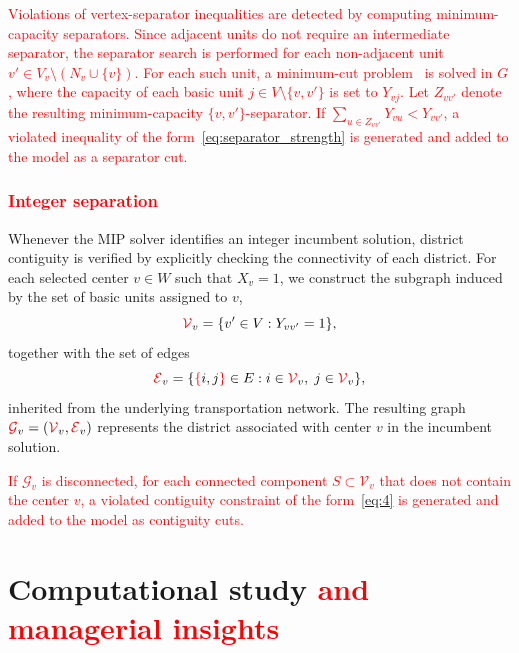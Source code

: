 \documentclass[preprint,11pt]{elsarticle}
\begin{document}
\textcolor{red}{
Violations of vertex-separator inequalities are detected by computing minimum-capacity separators.
Since adjacent units do not require an intermediate separator, the separator search is performed for each non-adjacent unit $v' \in V_v \setminus (N_v \cup \{v\})$.
For each such unit, a minimum-cut problem~\citep{Picard1975} is solved in $G$, where the capacity of each basic unit $j \in V \setminus \{v,v'\}$ is set to $Y_{vj}$.
Let $Z_{vv'}$ denote the resulting minimum-capacity $\{v,v'\}$-separator.
If $\sum_{u \in Z_{vv'}} Y_{vu} < Y_{vv'}$, a violated inequality of the form~\eqref{eq:separator_strength} is generated and added to the model as a separator cut.
}


\subsubsection{\textcolor{red}{Integer separation}}
\label{subsubsec:integer_separation}

Whenever the MIP solver identifies an integer incumbent solution, district contiguity is verified by explicitly checking the connectivity of each district.
For each selected center $v \in W$ such that $X_v = 1$, we construct the subgraph induced by the set of basic units assigned to $v$,
\begin{equation*}
    \textcolor{red}{\mathcal{V}}_v = \{ v' \in V : Y_{vv'} = 1 \},
\end{equation*}
together with the set of edges
\begin{equation*}
    \textcolor{red}{\mathcal{E}}_v = \{ \textcolor{red}{\{}i,j\textcolor{red}{\}} \in E : i \in \textcolor{red}{\mathcal{V}}_v,\; j \in \textcolor{red}{\mathcal{V}}_v \},
\end{equation*}
inherited from the underlying transportation network.
The resulting graph $\textcolor{red}{\mathcal{G}}_v = (\textcolor{red}{\mathcal{V}}_v, \textcolor{red}{\mathcal{E}}_v)$ represents the district associated with center $v$ in the incumbent solution.

\textcolor{red}{
If $\mathcal{G}_v$ is disconnected, for each connected component $S \subset \mathcal{V}_v$ that does not contain the center $v$, a violated contiguity constraint of the form~\eqref{eq:4} is generated and added to the model as contiguity cuts.
}


\section{Computational study \textcolor{red}{and managerial insights}} \label{sec:computational}
\end{document}
